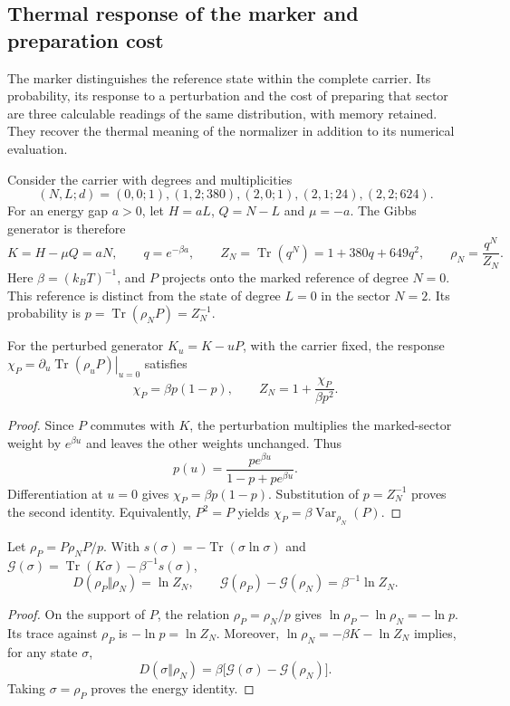 \subsection{Thermal response of the marker and preparation cost}
\label{sec:termica-respuesta-preparacion-recuperada}

The marker distinguishes the reference state within the complete carrier.
Its probability, its response to a perturbation and the cost of preparing
that sector are three calculable readings of the same distribution, with
memory retained. They recover the thermal meaning of the normalizer in
addition to its numerical evaluation.

Consider the carrier with degrees and multiplicities
\[
 (N,L;d)=(0,0;1),(1,2;380),(2,0;1),(2,1;24),(2,2;624).
\]
For an energy gap $a>0$, let $H=aL$, $Q=N-L$ and $\mu=-a$.
The Gibbs generator is therefore
\[
 K=H-\mu Q=aN,\qquad q=e^{-\beta a},\qquad
 Z_N=\operatorname{Tr}(q^N)=1+380q+649q^2,
 \qquad \rho_N=\frac{q^N}{Z_N}.
\]
Here $\beta=(k_B T)^{-1}$, and $P$ projects onto the marked reference
of degree $N=0$. This reference is distinct from the state of degree $L=0$
in the sector $N=2$. Its probability is
$p=\operatorname{Tr}(\rho_NP)=Z_N^{-1}$.

\begin{proposition}
For the perturbed generator $K_u=K-uP$, with the carrier fixed, the response
$\chi_P=\left.\partial_u\operatorname{Tr}(\rho_uP)\right|_{u=0}$ satisfies
\[
 \chi_P=\beta p(1-p),\qquad
 Z_N=1+\frac{\chi_P}{\beta p^2}.
\]
\end{proposition}
\begin{proof}
Since $P$ commutes with $K$, the perturbation multiplies the marked-sector
weight by $e^{\beta u}$ and leaves the other weights unchanged. Thus
\[
 p(u)=\frac{p e^{\beta u}}{1-p+p e^{\beta u}}.
\]
Differentiation at $u=0$ gives $\chi_P=\beta p(1-p)$.
Substitution of $p=Z_N^{-1}$ proves the second identity. Equivalently,
$P^2=P$ yields $\chi_P=\beta\operatorname{Var}_{\rho_N}(P)$.
\end{proof}

\begin{proposition}
Let $\rho_P=P\rho_NP/p$. With
$s(\sigma)=-\operatorname{Tr}(\sigma\ln\sigma)$ and
$\mathcal G(\sigma)=\operatorname{Tr}(K\sigma)-\beta^{-1}s(\sigma)$,
\[
 D(\rho_P\Vert\rho_N)=\ln Z_N,\qquad
 \mathcal G(\rho_P)-\mathcal G(\rho_N)=\beta^{-1}\ln Z_N.
\]
\end{proposition}
\begin{proof}
On the support of $P$, the relation $\rho_P=\rho_N/p$ gives
$\ln\rho_P-\ln\rho_N=-\ln p$. Its trace against $\rho_P$ is
$-\ln p=\ln Z_N$. Moreover,
$\ln\rho_N=-\beta K-\ln Z_N$ implies, for any state $\sigma$,
\[
 D(\sigma\Vert\rho_N)
 =\beta\bigl[\mathcal G(\sigma)-\mathcal G(\rho_N)\bigr].
\]
Taking $\sigma=\rho_P$ proves the energy identity.
\end{proof}

